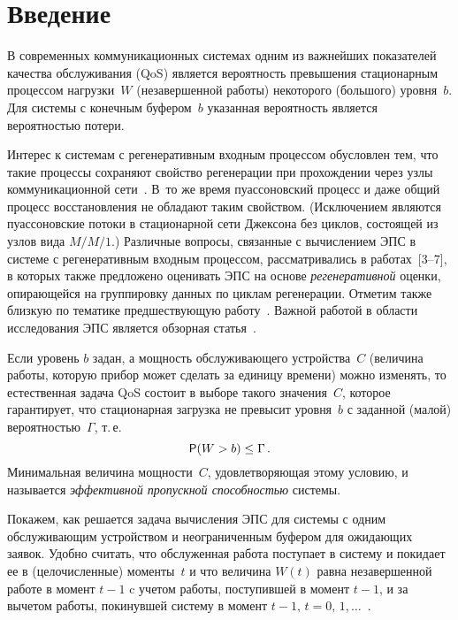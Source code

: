
      \thispagestyle{headings}

      \begin{multicols}{2}

            \label{st\stat}

\section{Введение}

В современных коммуникационных системах  одним из важнейших
показателей  качества  обслуживания (QoS) является вероятность
превышения стационарным процессом нагрузки~$W$ (незавершенной
работы) некоторого (большого) уровня~$b$. Для системы с конечным
буфером~$b$ указанная  вероятность является вероятностью потери.

Интерес к  системам с регенеративным входным процессом обусловлен
тем, что такие процессы сохраняют  свойство регенерации при
прохождении  через узлы коммуникационной сети~\cite{MorozovTechCyb87, MorozovOutput}. 
В~то же время пуассоновский
процесс   и даже общий процесс восстановления не обладают таким
свойством. (Исключением являются пуассоновские потоки в стационарной
сети Джексона без циклов, со\-сто\-ящей из узлов вида $M/M/1$.)
 Различные вопросы, связанные
с вычислением ЭПС в системе с регенеративным входным процессом,
рассматривались  в работах~[3--7], в
которых также предложено оценивать ЭПС на основе {\it
регенеративной} оценки, опирающейся на группировку данных по циклам
регенерации. Отметим  также близкую по тематике предшествующую
работу~\cite{Crosby}.   Важной работой в
 области исследования ЭПС является обзорная статья~\cite{Kelly}.

Если уровень $b$ задан, а  мощность   обслуживающего устройства~$C$
(величина работы, которую прибор может сделать за единицу времени)
можно изменять, то естественная задача QoS состоит в   выборе такого
значения~$C$, которое гарантирует, что  стационарная загрузка не
превысит уровня~$b$ с заданной (малой) вероятностью~$\Gamma$, т.\,е.\
\begin{equation}
{\sf P}(W>b)\le \Gamma\,.\label{1-bor}
\end{equation}
Минимальная  величина мощности~$C$, удовлетворяющая этому  условию,
и называется  \textit{эффективной пропускной способностью} сис\-темы.

Покажем, как решается  задача вычисления  ЭПС для системы с одним
обслуживающим устройством и неограниченным  буфером  для ожидающих
заявок. Удобно считать, что
  обслуженная работа поступает в систему и покидает ее
 в  (целочисленные) моменты~$t$   и что   величина $W(t)$
 равна  незавершенной работе в момент $t-1$ c учетом работы,
 поступившей в момент $t-1$,  и за вычетом  работы,
 покинувшей систему в момент $t-1,\,t=0,\,1,\ldots$~\cite{Lewis}.


\end{multicols}
